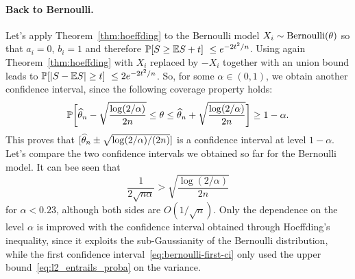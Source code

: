 \paragraph{Back to Bernoulli.} %

Let's apply Theorem~\ref{thm:hoeffding} to the Bernoulli model $X_i \sim \operatorname{Bernoulli}(\theta)$ so that $a_i = 0$, $b_i = 1$ and therefore $\P[ S \geq \E S + t] \leq e^{-2 t^2 / n}$.
Using again Theorem~\ref{thm:hoeffding} with $X_i$ replaced by $-X_i$ together with an union bound%
%
leads to $\P[ | S - \E S | \geq t] \leq 2 e^{-2 t^2 / n}$.
So, for some $\alpha \in (0, 1)$, we obtain another confidence interval, since the following coverage property holds:
\begin{equation*}
	\mathbb P \bigg[ \widehat \theta_n - \sqrt{\frac{\log(2 / \alpha)}{2n}} \leq \theta \leq \widehat \theta_n 
	+ \sqrt{\frac{\log(2 / \alpha)}{2n}} \bigg] \geq 1 - \alpha.
\end{equation*}
This proves that $[\widehat \theta_n \pm \sqrt{\log(2 / \alpha) / (2n)}]$ is a confidence interval at level $1 - \alpha$.%
Let's compare the two confidence intervals we obtained so far for the Bernoulli model.
It can bee seen that
\begin{equation*}
	\frac{1}{2 \sqrt{n \alpha}} > \sqrt{\frac{\log(2 / \alpha)}{2n}} 
\end{equation*}
for $\alpha < 0.23$, although both sides are $O(1 / \sqrt n)$.
Only the dependence on the level $\alpha$ is improved with the confidence interval obtained through Hoeffding's inequality, since it exploits the sub-Gaussianity of the Bernoulli distribution, while the first confidence interval~\eqref{eq:bernoulli-first-ci} only used the upper bound~\eqref{eq:l2_entrails_proba} on the variance.%

